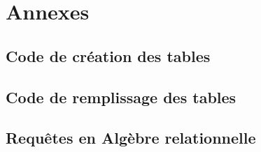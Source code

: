 \documentclass[french]{article}
\begin{document}
\newpage
\appendix
\section{Annexes}

\subsection{Code de création des tables}

\setlength{\columnsep}{1.5cm}
\begin{multicols}{2}

\end{multicols}

\subsection{Code de remplissage des tables}

\setlength{\columnsep}{1.5cm}
\begin{multicols}{2}

\end{multicols}

\subsection{Requêtes en Algèbre relationnelle}

\setlength{\columnsep}{1.5cm}
\begin{multicols}{2}

\end{multicols}
\end{document}
